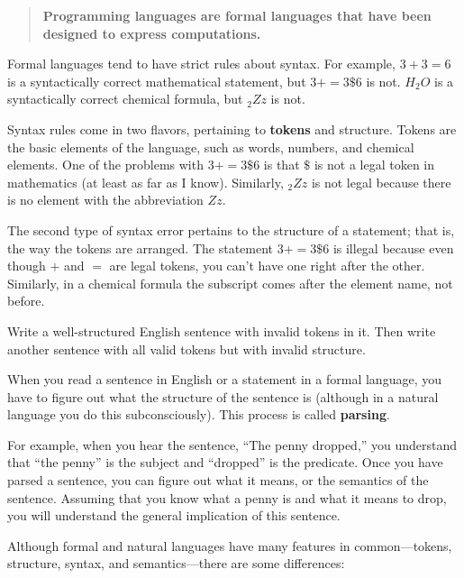 \documentclass[10pt]{book}
\begin{document}
\begin{quote}
{\bf Programming languages are formal languages that have been
designed to express computations.}
\end{quote}

Formal languages tend to have strict rules about syntax.  For example,
$3 + 3 = 6$ is a syntactically correct mathematical statement, but 
$3 + = 3 \mbox{\$} 6$ is not.  $H_2O$ is a syntactically correct
chemical formula, but $_2Zz$ is not.

Syntax rules come in two flavors, pertaining to {\bf tokens} and
structure.  Tokens are the basic elements of the language, such as
words, numbers, and chemical elements.  One of the problems with $3 +
= 3 \mbox{\$} 6$ is that $\$$ is not a legal token in mathematics
(at least as far as I know).  Similarly, $_2Zz$ is not legal because
there is no element with the abbreviation $Zz$.


The second type of syntax error pertains to the structure of a
statement; that is, the way the tokens are arranged.  The statement $3
+ = 3 \mbox{\$} 6$ is illegal because even though $+$ and $=$ are
legal tokens, you can't have one right after the other.  Similarly,
in a chemical formula the subscript comes after the element name, not
before.

\begin{ex}
Write a well-structured English
sentence with invalid tokens in it.  Then write another sentence
with all valid tokens but with invalid structure.
\end{ex}

When you read a sentence in English or a statement in a formal
language, you have to figure out what the structure of the sentence is
(although in a natural language you do this subconsciously).  This
process is called {\bf parsing}.


For example, when you hear the sentence, ``The penny dropped,'' you
understand that ``the penny'' is the subject and ``dropped'' is the
predicate.  Once you have parsed a sentence, you can figure out what it
means, or the semantics of the sentence.  Assuming that you know
what a penny is and what it means to drop, you will understand the
general implication of this sentence.

Although formal and natural languages have many features in
common---tokens, structure, syntax, and semantics---there are some
differences:
\end{document}
